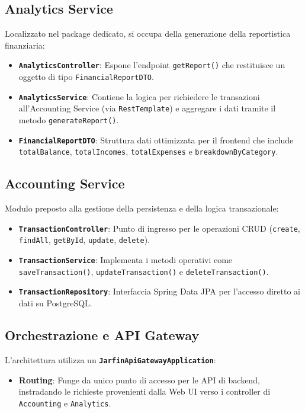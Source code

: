 \subsection{Analytics Service}
Localizzato nel package dedicato, si occupa della generazione della reportistica finanziaria:
\begin{itemize}
    \item \textbf{\texttt{AnalyticsController}}: Espone l'endpoint \texttt{getReport()} che restituisce un oggetto di tipo \texttt{FinancialReportDTO}.
    \item \textbf{\texttt{AnalyticsService}}: Contiene la logica per richiedere le transazioni all'Accounting Service (via \texttt{RestTemplate}) e aggregare i dati tramite il metodo \texttt{generateReport()}.
    \item \textbf{\texttt{FinancialReportDTO}}: Struttura dati ottimizzata per il frontend che include \texttt{totalBalance}, \texttt{totalIncomes}, \texttt{totalExpenses} e \texttt{breakdownByCategory}.
\end{itemize}

\subsection{Accounting Service}
Modulo preposto alla gestione della persistenza e della logica transazionale:
\begin{itemize}
    \item \textbf{\texttt{TransactionController}}: Punto di ingresso per le operazioni CRUD (\texttt{create}, \texttt{findAll}, \texttt{getById}, \texttt{update}, \texttt{delete}).
    \item \textbf{\texttt{TransactionService}}: Implementa i metodi operativi come \texttt{saveTransaction()}, \texttt{updateTransaction()} e \texttt{deleteTransaction()}.
    \item \textbf{\texttt{TransactionRepository}}: Interfaccia Spring Data JPA per l'accesso diretto ai dati su PostgreSQL.
\end{itemize}

\subsection{Orchestrazione e API Gateway}
L'architettura utilizza un \textbf{\texttt{JarfinApiGatewayApplication}}:
\begin{itemize}
    \item \textbf{Routing}: Funge da unico punto di accesso per le API di backend, instradando le richieste provenienti dalla Web UI verso i controller di \texttt{Accounting} e \texttt{Analytics}.
\end{itemize}

